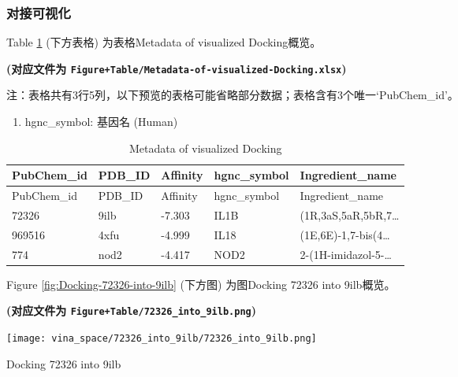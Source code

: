 \documentclass[
]{article}
\providecommand{\tightlist}{%
  \setlength{\itemsep}{0pt}\setlength{\parskip}{0pt}}
\begin{document}
\hypertarget{ux5bf9ux63a5ux53efux89c6ux5316}{%
\subsubsection{对接可视化}\label{ux5bf9ux63a5ux53efux89c6ux5316}}

Table \ref{tab:Metadata-of-visualized-Docking} (下方表格) 为表格Metadata of visualized Docking概览。

\textbf{(对应文件为 \texttt{Figure+Table/Metadata-of-visualized-Docking.xlsx})}

\begin{center}\begin{tcolorbox}[colback=gray!10, colframe=gray!50, width=0.9\linewidth, arc=1mm, boxrule=0.5pt]注：表格共有3行5列，以下预览的表格可能省略部分数据；表格含有3个唯一`PubChem\_id'。
\end{tcolorbox}
\end{center}
\begin{center}\begin{tcolorbox}[colback=gray!10, colframe=gray!50, width=0.9\linewidth, arc=1mm, boxrule=0.5pt]\begin{enumerate}\tightlist
\item hgnc\_symbol:  基因名 (Human)
\end{enumerate}\end{tcolorbox}
\end{center}

\begin{longtable}[]{@{}lllll@{}}
\caption{\label{tab:Metadata-of-visualized-Docking}Metadata of visualized Docking}\tabularnewline
\toprule
PubChem\_id & PDB\_ID & Affinity & hgnc\_symbol & Ingredient\_name\tabularnewline
\midrule
\endfirsthead
\toprule
PubChem\_id & PDB\_ID & Affinity & hgnc\_symbol & Ingredient\_name\tabularnewline
\midrule
\endhead
72326 & 9ilb & -7.303 & IL1B & (1R,3aS,5aR,5bR,7\ldots{}\tabularnewline
969516 & 4xfu & -4.999 & IL18 & (1E,6E)-1,7-bis(4\ldots{}\tabularnewline
774 & nod2 & -4.417 & NOD2 & 2-(1H-imidazol-5-\ldots{}\tabularnewline
\bottomrule
\end{longtable}

Figure \ref{fig:Docking-72326-into-9ilb} (下方图) 为图Docking 72326 into 9ilb概览。

\textbf{(对应文件为 \texttt{Figure+Table/72326\_into\_9ilb.png})}

\def\@captype{figure}
\begin{center}
\texttt{[image: vina\_space/72326\_into\_9ilb/72326\_into\_9ilb.png]}
\caption{Docking 72326 into 9ilb}\label{fig:Docking-72326-into-9ilb}
\end{center}
\end{document}
